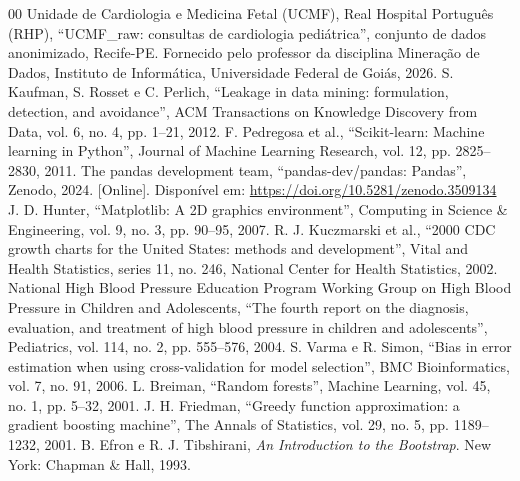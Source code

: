\documentclass[conference]{IEEEtran}
\begin{document}
\begin{thebibliography}{00}
 Unidade de Cardiologia e Medicina Fetal (UCMF), Real Hospital Português (RHP), ``UCMF\_raw: consultas de cardiologia pediátrica'', conjunto de dados anonimizado, Recife-PE. Fornecido pelo professor da disciplina Mineração de Dados, Instituto de Informática, Universidade Federal de Goiás, 2026.
 S. Kaufman, S. Rosset e C. Perlich, ``Leakage in data mining: formulation, detection, and avoidance'', ACM Transactions on Knowledge Discovery from Data, vol. 6, no. 4, pp. 1--21, 2012.
 F. Pedregosa et al., ``Scikit-learn: Machine learning in Python'', Journal of Machine Learning Research, vol. 12, pp. 2825--2830, 2011.
 The pandas development team, ``pandas-dev/pandas: Pandas'', Zenodo, 2024. [Online]. Disponível em: \url{https://doi.org/10.5281/zenodo.3509134}
 J. D. Hunter, ``Matplotlib: A 2D graphics environment'', Computing in Science \& Engineering, vol. 9, no. 3, pp. 90--95, 2007.
 R. J. Kuczmarski et al., ``2000 CDC growth charts for the United States: methods and development'', Vital and Health Statistics, series 11, no. 246, National Center for Health Statistics, 2002.
 National High Blood Pressure Education Program Working Group on High Blood Pressure in Children and Adolescents, ``The fourth report on the diagnosis, evaluation, and treatment of high blood pressure in children and adolescents'', Pediatrics, vol. 114, no. 2, pp. 555--576, 2004.
 S. Varma e R. Simon, ``Bias in error estimation when using cross-validation for model selection'', BMC Bioinformatics, vol. 7, no. 91, 2006.
 L. Breiman, ``Random forests'', Machine Learning, vol. 45, no. 1, pp. 5--32, 2001.
 J. H. Friedman, ``Greedy function approximation: a gradient boosting machine'', The Annals of Statistics, vol. 29, no. 5, pp. 1189--1232, 2001.
 B. Efron e R. J. Tibshirani, \textit{An Introduction to the Bootstrap}. New York: Chapman \& Hall, 1993.
\end{thebibliography}
\end{document}
